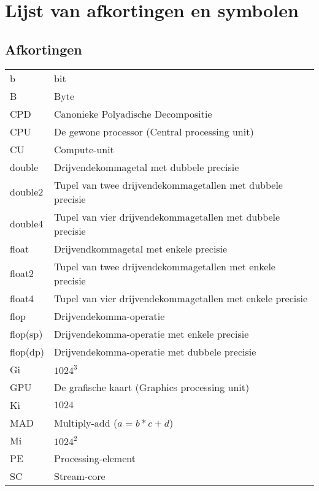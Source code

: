 \documentclass[master=cws ,masteroption=gs]{kulemt}
\begin{document}
\listoffiguresandtables
\chapter{Lijst van afkortingen en symbolen}
\section*{Afkortingen}
\begin{flushleft}
	\renewcommand{\arraystretch}{1.1}
  	\begin{tabularx}{\textwidth}{@{}p{12mm}X@{}}
		b				& bit\\
		B				& Byte\\
    	CPD				& Canonieke Polyadische Decompositie\\
    	CPU				& De gewone processor (Central processing unit)\\
    	CU				& Compute-unit\\
    	double			& Drijvendekommagetal met dubbele precisie\\
    	double2			& Tupel van twee drijvendekommagetallen met dubbele precisie\\
    	double4			& Tupel van vier drijvendekommagetallen met dubbele precisie\\
    	float			& Drijvendkommagetal met enkele precisie\\
    	float2			& Tupel van twee drijvendekommagetallen met enkele precisie\\
    	float4			& Tupel van vier drijvendekommagetallen met enkele precisie\\
    	flop			& Drijvendekomma-operatie\\
    	flop(sp)		& Drijvendekomma-operatie met enkele precisie\\
    	flop(dp)		& Drijvendekomma-operatie met dubbele precisie\\
    	Gi				& $1024^3$\\
    	GPU				& De grafische kaart (Graphics processing unit)\\
    	Ki				& $1024$\\
    	MAD				& Multiply-add ($a = b * c + d$)\\
    	Mi				& $1024^2$\\
    	PE				& Processing-element\\
    	SC				& Stream-core\\
  	\end{tabularx}
\end{flushleft}
\newpage
\end{document}

